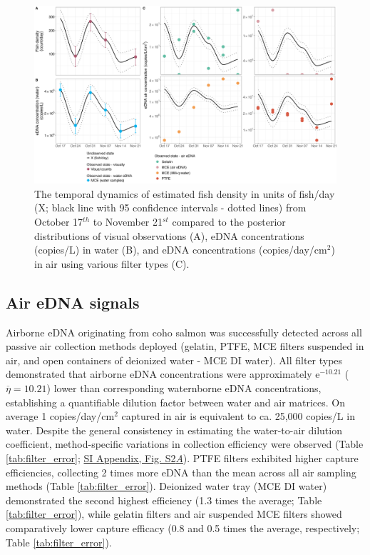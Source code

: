\documentclass{article}
\begin{document}
\begin{figure}[tbhp] 
\centering
\includegraphics[width=16.5cm]{Plots/Figure_1.jpg}  
\caption{The temporal dynamics of estimated fish density in units of fish/day (X; black line with 95 confidence intervals - dotted lines) from October 17$^{th}$ to November 21$^{st}$ compared to the posterior distributions of visual observations (A), eDNA concentrations (copies/L) in water (B), and eDNA concentrations (copies/day/cm$^2$) in air using various filter types (C).}
\label{fig:fig1}
\end{figure}


\subsection{Air eDNA signals}
Airborne eDNA originating from coho salmon was successfully detected across all passive air collection methods deployed (gelatin, PTFE, MCE filters suspended in air, and open containers of deionized water - MCE DI water). All filter types demonstrated that airborne eDNA concentrations were approximately e$^{-10.21}$ ($\overline\eta = 10.21$) lower than corresponding waternborne eDNA concentrations, establishing a quantifiable dilution factor between water and air matrices. On average 1 copies/day/cm$^2$ captured in air is equivalent to ca. 25,000 copies/L in water. Despite the general consistency in estimating the water-to-air dilution coefficient, method-specific variations in collection efficiency were observed (Table \ref{tab:filter_error}; \href{SI_Appendix.pdf}{SI Appendix, Fig. S2\textit{A}}). PTFE filters exhibited higher capture efficiencies, collecting 2 times more eDNA than the mean across all air sampling methods (Table \ref{tab:filter_error}). Deionized water tray (MCE DI water) demonstrated the second highest efficiency (1.3 times the average; Table \ref{tab:filter_error}), while gelatin filters and air suspended MCE filters showed comparatively lower capture efficacy (0.8 and 0.5 times the average, respectively; Table \ref{tab:filter_error}).
\end{document}
